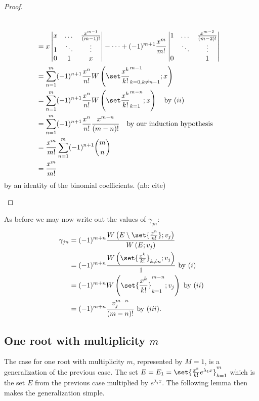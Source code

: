 \documentclass{article}
\begin{document}
\begin{proof}
\begin{description}
\begin{align*}
\\
& = x \begin{vmatrix} x & \dots & \poly{m-1} \\ 1 & \ddots & \vdots \\ 0 & 1 & x \end{vmatrix} - \dots + (-1)^{m+1} \Poly{m} \begin{vmatrix} 1 & \dots & \poly{m-2} \\  & \ddots & \vdots \\ 0 &  & 1 \end{vmatrix} \\
& = \sum_{n=1}^m (-1)^{n+1} \Poly{n} \Wpoly{k=0,k \neq n-1}{m-1} \\
& = \sum_{n=1}^m (-1)^{n+1} \Poly{n} \Wpoly{k=1}{m-n} \quad \text{by $(ii)$} \\
& = \sum_{n=1}^m (-1)^{n+1} \Poly{n} \poly{m-n} \quad \text{by our induction hypothesis} \\
& = \Poly{m} \sum_{n=1}^m (-1)^{n+1} \binom{m}{n} \\
& = \Poly{m}
\end{align*}
by an identity of the binomial coefficients. (nb: cite)
\end{description}
\end{proof}

As before we may now write out the values of $\gamma_{jn}$:
\begin{equation*}
\begin{split}
\gamma_{jn} & = (-1)^{m+n} \frac{ \W{E \setminus \set{\Poly{n}}}{v_j}}{\W{E}{v_j}} \\
			& = (-1)^{m+n} \frac{\W{\set{\Poly{k}}_{k \neq n}}{v_j}}{1} \ \text{by $(i)$} \\
			& = (-1)^{m+n} \W{\set{\Poly{k}}_{k=1}^{m-n}}{v_j} \ \text{by $(ii)$} \\
			& = (-1)^{m+n} \frac{v_j^{m-n}}{(m-n)!} \ \text{by $(iii)$.}
\end{split}
\end{equation*}

\subsection{One root with multiplicity $m$}

The case for one root with multiplicity $m$, represented by $M=1$, is a generalization of the previous case.
The set $E = E_1 = \set{\Poly{k} e^{\lambda_1 x}}_{k=1}^m$ which is the set $E$ from the previous case multiplied by $e^{\lambda_1 x}$.
The following lemma then makes the generalization simple.
\end{document}

